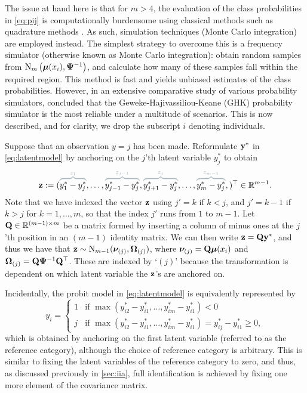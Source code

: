 The issue at hand here is that for $m>4$, the evaluation of the class probabilities in \cref{eq:pij} is computationally burdensome using classical methods such as quadrature methods \citet{geweke1994alternative}.
As such, simulation techniques (Monte Carlo integration) are employed instead.
The simplest strategy to overcome this is a frequency simulator (otherwise known as Monte Carlo integration): obtain random samples from $\operatorname{N}_{m}\big({\bm\mu}(x_i), {\bm\Psi}^{-1}\big)$, and calculate how many of these samples fall within the required  region.
This method is fast and yields unbiased estimates of the class probabilities.
However, in an extensive comparative study of various probability simulators, \citet{hajivassiliou1996simulation} concluded that the Geweke-Hajivassiliou-Keane (GHK) probability simulator \citep{geweke1989bayesian,hajivassiliou1998method,keane1994solution} is the most reliable under a multitude of scenarios.
This is now described, and for clarity, we drop the subscript $i$ denoting individuals. 

Suppose that an observation $y=j$ has been made.
Reformulate ${\mathbf y}^*$ in \cref{eq:latentmodel} by anchoring on the $j$'th latent variable $y_j^*$ to obtain
\[
  \bz := (
  \greyoverbrace{y_1^* - y_j^*}{ z_1},
  \dots,
  \greyoverbrace{y_{j-1}^* - y_j^*}{ z_{j-1}},
  \greyoverbrace{y_{j+1}^* - y_j^*}{ z_{j}},
  \dots, 
  \greyoverbrace{y_m^* - y_j^*}{ z_{m-1}},
  )^\top \in \bbR^{m-1}.
\]
Note that we have indexed the vector ${\mathbf z}$ using $j' = k$ if $k < j$, and $j' = k -1$ if $k > j$ for $k=1,\dots,m$, so that the index $j'$ runs from $1$ to $m-1$.
Let ${\mathbf Q} \in \mathbb{R}^{(m-1)\times m}$ be a matrix formed by inserting a column of minus ones at the $j$'th position in an $(m-1)$ identity matrix.
We can then write ${\mathbf z} = {\mathbf Q}{\mathbf y}^*$, and thus we have that ${\mathbf z}\sim\operatorname{N}_{m-1}({\bm\nu}_{(j)}, {\bm\Omega}_{(j)})$, where ${\bm\nu}_{(j)} = {\mathbf Q}{\bm\mu}(x_i)$ and ${\bm\Omega}_{(j)} = {\mathbf Q}{\bm\Psi}^{-1}{\mathbf Q}^\top$.
These are indexed by `$(j)$' because the transformation is dependent on which latent variable the ${\mathbf z}$'s are anchored on.

\begin{remark}
  Incidentally, the probit model in \cref{eq:latentmodel} is equivalently represented by 
  \begin{equation}\label{eq:latentmodel2}
    y_i = 
    \begin{cases}
      1 & \text{if } \max (y_{i2}^* - y_{i1}^*,\dots,y_{im}^* - y_{i1}^*) < 0 \\
      j & \text{if } \max (y_{i2}^* - y_{i1}^*,\dots,y_{im}^* - y_{i1}^*) = y_{ij}^* - y_{i1}^* \geq 0,
    \end{cases}
  \end{equation}   
  which is obtained by anchoring on the first latent variable (referred to as the reference category), although the choice of reference category is arbitrary.
  This is similar to fixing the latent variables of the reference category to zero, and thus, as discussed previously in \cref{sec:iia}, full identification is achieved by fixing one more element of the covariance matrix.
\end{remark}

